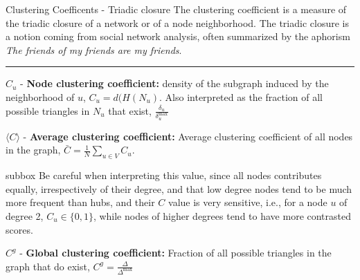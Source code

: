 \documentclass[a4paper,11pt]{book}
\begin{document}
\begin{textbox}{Clustering Coefficents - Triadic closure}
The clustering coefficient is a measure of the triadic closure of a network or of a node neighborhood. The triadic closure is a notion coming from social network analysis, often summarized by the aphorism \textit{The friends of my friends are my friends}. 

\noindent\rule{4cm}{0.1pt}


$C_u$ - \textbf{Node clustering coefficient:} density of the subgraph induced by the neighborhood of $u$, $C_u = d(H(N_u)$. Also interpreted as the fraction of all possible triangles in $N_u$ that exist, $\frac{\delta_u}{\delta^{\max}_u}$

$\langle C \rangle$ - \textbf{Average clustering coefficient:} Average clustering coefficient of all nodes in the graph, $\bar C = \frac{1}{N}\sum_{u \in V} C_u$.\\ 

\begin{subbox}{subbox}{}
\tiny{Be careful when interpreting this value, since all nodes contributes equally, irrespectively of their degree, and that low degree nodes tend to be much more frequent than hubs, and their $C$ value is very sensitive, i.e., for a node $u$ of degree 2, $C_u \in \{0,1\}$, while nodes of higher degrees tend to have more contrasted scores.}
\end{subbox}

$C^g$ - \textbf{Global clustering coefficient:} Fraction of all possible triangles in the graph that do exist, $C^g= \frac{\Delta}{\Delta^{\max}} $

\end{textbox}
\end{document}
